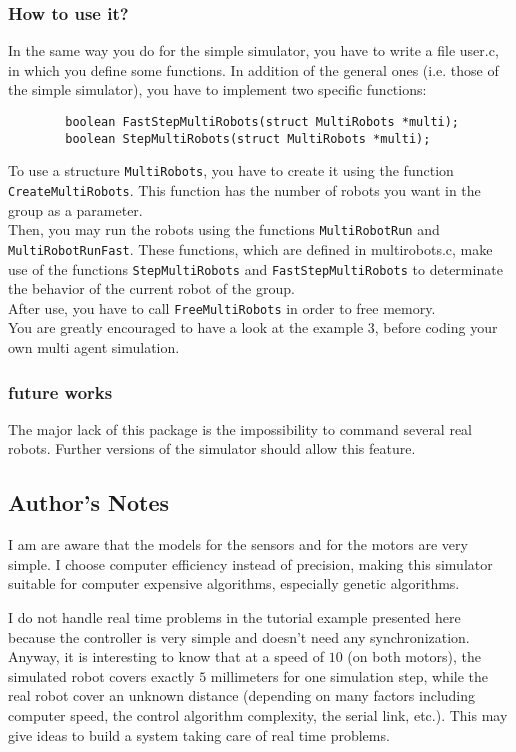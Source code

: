 \documentclass[a4paper,twoside]{article}
\begin{document}
\subsubsection{How to use it?}
In the same way you do for the simple simulator, you have to write a file user.c, in which you define some functions. In addition of the general ones (i.e. those of the simple simulator), you have to implement two specific functions:\\
\begin{verbatim}
        boolean FastStepMultiRobots(struct MultiRobots *multi);
        boolean StepMultiRobots(struct MultiRobots *multi);
\end{verbatim}
To use a structure {\tt MultiRobots}, you have to create it using the function
{\tt CreateMultiRobots}. This function has the number of robots you want in
the group as a parameter.\\
Then, you  may run the robots using the functions {\tt MultiRobotRun}
and {\tt MultiRobotRunFast}. These functions, which are defined in
multirobots.c, make use of the functions {\tt StepMultiRobots} and
{\tt FastStepMultiRobots} to determinate the behavior of the current robot of
the group.\\
After use, you have to call {\tt FreeMultiRobots} in order to free memory.\\
You are greatly encouraged to have a look at the example 3, before coding your own multi agent simulation.
\subsubsection{future works}
The major lack of this package is the impossibility to command several real robots. Further versions of the simulator should allow this feature.\\ 

\subsection{Author's Notes}

I am are aware that the models for the sensors and for the motors are very
simple. I choose computer efficiency instead of precision, making this
simulator suitable for computer expensive algorithms, especially genetic
algorithms.

I do not handle real time problems in the tutorial example presented here
because the controller is very simple and doesn't need any synchronization.
Anyway, it is interesting to know that at a speed of $10$ (on both motors),
the simulated robot covers exactly $5$ millimeters for one simulation step,
while the real robot cover an unknown distance (depending on many factors
including computer speed, the control algorithm complexity, the serial link,
etc.). This may give ideas to build a system taking care of real time problems.
\end{document}

